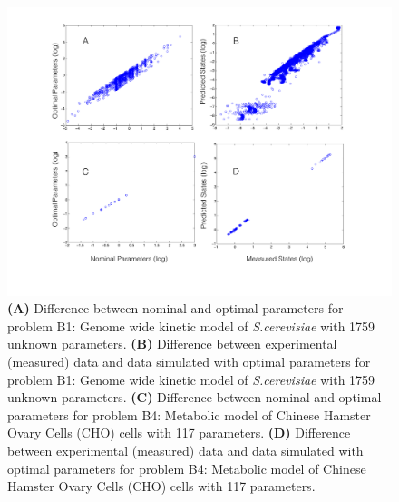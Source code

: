 \documentclass[12pt]{article}
\begin{document}
\begin{figure}[ht]
\centering
\includegraphics[width=1.00\textwidth,height=0.7\textheight]{./figs/Figure_B1_B4_params_measuredstates}
\caption{ \textbf {(A)} Difference between nominal and optimal parameters for problem B1: Genome wide kinetic model of \textit{S.cerevisiae} with 1759 unknown parameters. \textbf {(B)} Difference between experimental (measured) data and data simulated with optimal parameters for problem B1: Genome wide kinetic model of \textit{S.cerevisiae} with 1759 unknown parameters. \textbf {(C)} Difference between nominal and optimal parameters for problem B4: Metabolic model of Chinese  Hamster Ovary Cells (CHO) cells with 117 parameters. \textbf {(D)} Difference between experimental (measured) data and data simulated with optimal parameters for problem B4: Metabolic model of Chinese  Hamster Ovary Cells (CHO) cells with 117 parameters.
}\label{fig-benchmark}
\end{figure}
\end{document}
